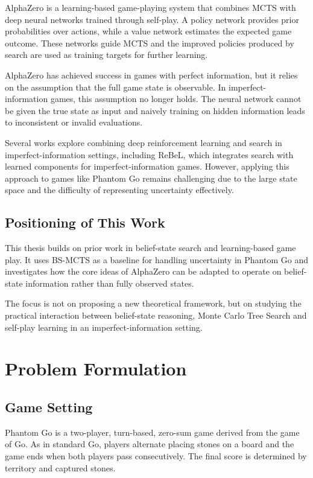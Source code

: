 \documentclass[12pt,oneside,openright]{article}
\begin{document}
AlphaZero is a learning-based game-playing system that combines MCTS with deep neural networks trained through self-play.
A policy network provides prior probabilities over actions, while a value network estimates the expected game outcome.
These networks guide MCTS and the improved policies produced by search are used as training targets for further learning\cite{Silver2017alphazero}.

AlphaZero has achieved success in games with perfect information, but it relies on the assumption that the full game state is observable.
In imperfect-information games, this assumption no longer holds. The neural network cannot be given the true state as input and naively training on hidden information leads to inconsistent or invalid evaluations.

Several works explore combining deep reinforcement learning and search in imperfect-information settings, including ReBeL, which integrates search with learned components for imperfect-information games.
However, applying this approach to games like Phantom Go remains challenging due to the large state space and the difficulty of representing uncertainty effectively\cite{Brown2020rebel}.

\subsection{Positioning of This Work}

This thesis builds on prior work in belief-state search and learning-based game play.
It uses BS-MCTS as a baseline for handling uncertainty in Phantom Go and investigates how the core ideas of AlphaZero can be adapted to operate on belief-state information rather than fully observed states.

The focus is not on proposing a new theoretical framework, but on studying the practical interaction between belief-state reasoning, Monte Carlo Tree Search and self-play learning in an imperfect-information setting.


\section{Problem Formulation}

\subsection{Game Setting}

Phantom Go is a two-player, turn-based, zero-sum game derived from the game of Go.
As in standard Go, players alternate placing stones on a board and the game ends when both players pass consecutively.
The final score is determined by territory and captured stones.
\end{document}
